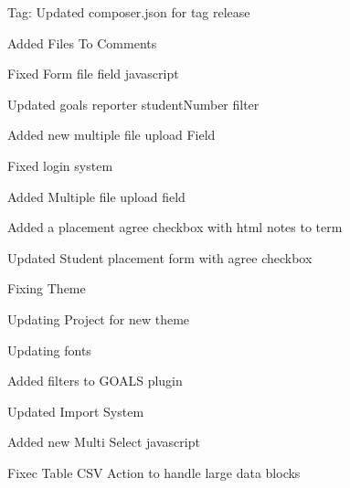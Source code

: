 \begin{DoxyItemize}
\item Tag\+: Updated composer.\+json for tag release
\item Added Files To Comments
\item Fixed Form file field javascript
\item Updated goals reporter student\+Number filter
\item Added new multiple file upload Field
\item Fixed login system
\item Added Multiple file upload field
\item Added a placement agree checkbox with html notes to term
\item Updated Student placement form with agree checkbox
\item Fixing Theme
\item Updating Project for new theme
\item Updating fonts
\item Added filters to G\+O\+A\+L\+S plugin
\item Updated Import System
\item Added new Multi Select javascript
\item Fixec Table C\+S\+V Action to handle large data blocks 
\end{DoxyItemize}